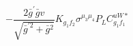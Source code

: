 %
\begin{dmath*}
%
  -  \frac{2 {\bar g}^\prime {\bar g}{} v}{\sqrt{{\bar g}^{\prime 2} + {\bar g}{}^2}} K_{g_1 f_2} \sigma^{\mu_3 \mu_4} P_L  C^{uW*}_{g_1 f_1}
%
\end{dmath*}
%
